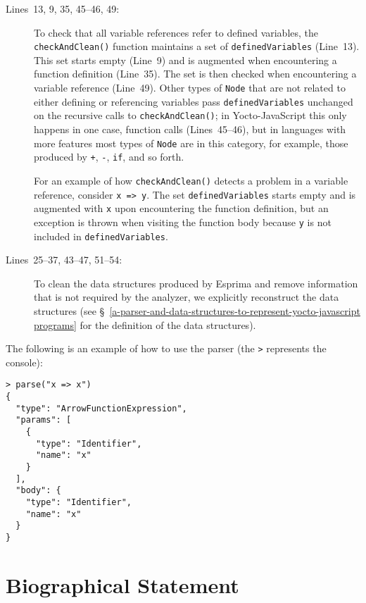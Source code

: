 \documentclass[12pt, oneside]{book}
\begin{document}
\begin{description}
\item [Lines~13, 9, 35, 45–46, 49:]

To check that all variable references refer to defined variables, the \texttt{checkAndClean()} function maintains a set of \texttt{definedVariables} (Line~13). This set starts empty (Line~9) and is augmented when encountering a function definition (Line~35). The set is then checked when encountering a variable reference (Line~49). Other types of \texttt{Node} that are not related to either defining or referencing variables pass \texttt{definedVariables} unchanged on the recursive calls to \texttt{checkAndClean()}; in Yocto-JavaScript this only happens in one case, function calls (Lines~45–46), but in languages with more features most types of \texttt{Node} are in this category, for example, those produced by \texttt{+}, \texttt{-}, \texttt{if}, and so forth.

For an example of how \texttt{checkAndClean()} detects a problem in a variable reference, consider \texttt{x => y}. The set \texttt{definedVariables} starts empty and is augmented with \texttt{x} upon encountering the function definition, but an exception is thrown when visiting the function body because \texttt{y} is not included in \texttt{definedVariables}.

\item [Lines~25–37, 43–47, 51–54:]

To clean the data structures produced by Esprima and remove information that is not required by the analyzer, we explicitly reconstruct the data structures (see §~\ref{a-parser-and-data-structures-to-represent-yocto-javascript programs} for the definition of the data structures).
\end{description}

The following is an example of how to use the parser (the \texttt{>} represents the console):

\begin{verbatim}
> parse("x => x")
{
  "type": "ArrowFunctionExpression",
  "params": [
    {
      "type": "Identifier",
      "name": "x"
    }
  ],
  "body": {
    "type": "Identifier",
    "name": "x"
  }
}
\end{verbatim}

\backmatter




\chapter{Biographical Statement}

\end{document}
